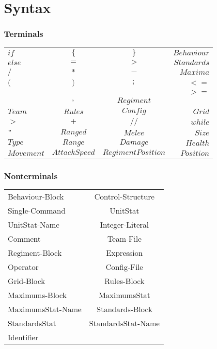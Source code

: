 \section{Syntax}
	\subsubsection{Terminals}
		
		\begin{tabular}{ l c c r}
			$if  	 $	& $\{ 	 $		&$ \} 	  $				&$ Behaviour$  \\
		  	$else	 $	&$ = 	$		&$ >  	  $				&$ Standards$  \\
		 	$/ 		 $	&$ *  	 $		&$ -  	  $				&$ Maxima$	  \\
		 	$( 		 $	&$ )  	 $		&$ ;  	  $				&$ < =$		  \\
			 			&				&						&$ > =$	    \\
		 				&$ ,      $		&$ Regiment$			&  \\
			$Team	 $	&$ Rules   $	&$ Config   $			&$ Grid$	   \\
			$>		 $	&$   + 	 $		&$ //	 	  $			&$ while $   \\
			$ "		 $	&$ Ranged  $	&$   Melee  $			&$ Size	$	\\
			$ Type	 $	&$ Range  $		&$   Damage  $			&$ Health	$	\\		
			$ Movement $&$ AttackSpeed $&$   RegimentPosition  $&$ Position	$	\\	
		\end{tabular}
	\subsubsection{Nonterminals}
		\begin{tabular}{l c}
			Behaviour-Block   & Control-Structure   \\
			Single-Command    & UnitStat 			\\
			UnitStat-Name	  & Integer-Literal		\\
			Comment			  & Team-File 			\\
			Regiment-Block	  & Expression			\\
			Operator		  & Config-File			\\
			Grid-Block	      & Rules-Block 		\\
			Maximums-Block	  & MaximumsStat		\\
			MaximumsStat-Name & Standards-Block	 	\\
			StandardsStat	  & StandardsStat-Name 	\\
			Identifier		  & 					\\
		\end{tabular}
	
